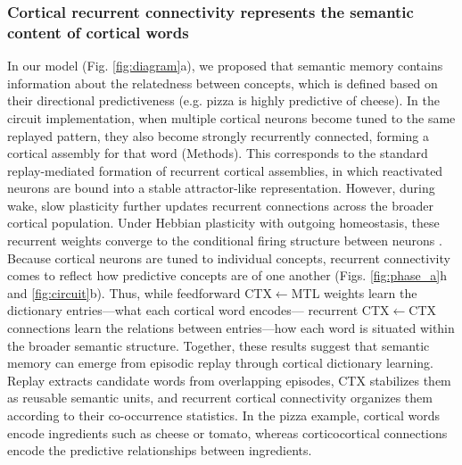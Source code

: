\documentclass{article}
\begin{document}
\subsubsection*{Cortical recurrent connectivity represents the semantic content of cortical words}
In our model (Fig. \ref{fig:diagram}a), we proposed that semantic memory contains information about the relatedness between concepts, which is defined based on their directional predictiveness (e.g. pizza is highly predictive of cheese). In the circuit implementation, when multiple cortical neurons become tuned to the same replayed pattern, they also become strongly recurrently connected, forming a cortical assembly for that word (Methods). This corresponds to the standard replay-mediated formation of recurrent cortical assemblies, in which reactivated neurons are bound into a stable attractor-like representation. However, during wake, slow plasticity further updates recurrent connections across the broader cortical population. Under Hebbian plasticity with outgoing homeostasis, these recurrent weights converge to the conditional firing structure between neurons \cite{albesagonzalez_2025}. Because cortical neurons are tuned to individual concepts, recurrent connectivity comes to reflect how predictive concepts are of one another (Figs. \ref{fig:phase_a}h and \ref{fig:circuit}b). Thus, while feedforward CTX$\leftarrow$MTL weights learn the dictionary entries---what each cortical word encodes--- recurrent CTX$\leftarrow$CTX connections learn the relations between entries---how each word is situated within the broader semantic structure.
\newline\newline
Together, these results suggest that semantic memory can emerge from episodic replay through cortical dictionary learning. Replay extracts candidate words from overlapping episodes, CTX stabilizes them as reusable semantic units, and recurrent cortical connectivity organizes them according to their co-occurrence statistics. In the pizza example, cortical words encode ingredients such as cheese or tomato, whereas corticocortical connections encode the predictive relationships between ingredients.
\end{document}
